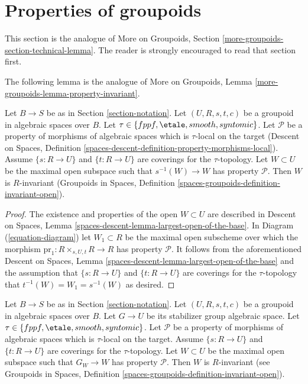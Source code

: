 \section{Properties of groupoids}
\label{section-technical-lemma}

\noindent
This section is the analogue of
More on Groupoids, Section \ref{more-groupoids-section-technical-lemma}.
The reader is strongly encouraged to read that section first.

\medskip\noindent
The following lemma is the analogue of
More on Groupoids, Lemma \ref{more-groupoids-lemma-property-invariant}.

\begin{lemma}
\label{lemma-property-invariant}
Let $B \to S$ be as in Section \ref{section-notation}.
Let $(U, R, s, t, c)$ be a groupoid in algebraic spaces over $B$.
Let
$\tau \in \{fppf, \linebreak[0] \etale, \linebreak[0]
smooth, \linebreak[0] syntomic\}$.
Let $\mathcal{P}$ be a property of morphisms of algebraic spaces
which is $\tau$-local on the target
(Descent on Spaces,
Definition \ref{spaces-descent-definition-property-morphisms-local}).
Assume $\{s : R \to U\}$ and $\{t : R \to U\}$ are coverings for the
$\tau$-topology. Let $W \subset U$ be the maximal open subspace such that
$s^{-1}(W) \to W$ has property $\mathcal{P}$.
Then $W$ is $R$-invariant
(Groupoids in Spaces,
Definition \ref{spaces-groupoids-definition-invariant-open}).
\end{lemma}

\begin{proof}
The existence and properties of the open $W \subset U$ are described in
Descent on Spaces, Lemma \ref{spaces-descent-lemma-largest-open-of-the-base}.
In
Diagram (\ref{equation-diagram})
let $W_1 \subset R$ be the maximal open subscheme over which the morphism
$\text{pr}_1 : R \times_{s, U, t} R \to R$ has property $\mathcal{P}$.
It follows from the aforementioned
Descent on Spaces, Lemma \ref{spaces-descent-lemma-largest-open-of-the-base}
and the assumption that $\{s : R \to U\}$ and $\{t : R \to U\}$ are coverings
for the $\tau$-topology that $t^{-1}(W) = W_1 = s^{-1}(W)$ as desired.
\end{proof}

\begin{lemma}
\label{lemma-property-G-invariant}
Let $B \to S$ be as in Section \ref{section-notation}.
Let $(U, R, s, t, c)$ be a groupoid in algebraic spaces over $B$.
Let $G \to U$ be its stabilizer group algebraic space.
Let
$\tau \in \{fppf, \linebreak[0] \etale, \linebreak[0]
smooth, \linebreak[0] syntomic\}$.
Let $\mathcal{P}$ be a property of morphisms of algebraic spaces
which is $\tau$-local on the target.
Assume $\{s : R \to U\}$ and $\{t : R \to U\}$ are coverings for the
$\tau$-topology. Let $W \subset U$ be the maximal open subspace such that
$G_W \to W$ has property $\mathcal{P}$.
Then $W$ is $R$-invariant (see
Groupoids in Spaces,
Definition \ref{spaces-groupoids-definition-invariant-open}).
\end{lemma}

